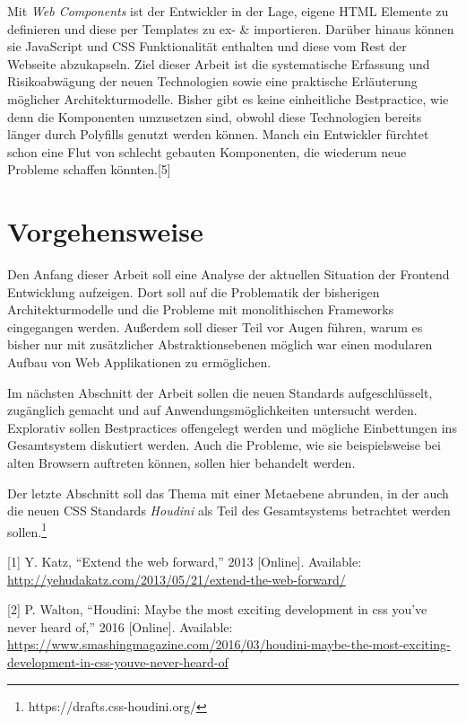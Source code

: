 Mit \emph{Web Components} ist der Entwickler in der Lage, eigene HTML
Elemente zu definieren und diese per Templates zu ex- \& importieren.
Darüber hinaus können sie JavaScript und CSS Funktionalität enthalten
und diese vom Rest der Webseite abzukapseln. Ziel dieser Arbeit ist die
systematische Erfassung und Risikoabwägung der neuen Technologien sowie
eine praktische Erläuterung möglicher Architekturmodelle. Bisher gibt es
keine einheitliche Bestpractice, wie denn die Komponenten umzusetzen
sind, obwohl diese Technologien bereits länger durch Polyfills genutzt
werden können. Manch ein Entwickler fürchtet schon eine Flut von
schlecht gebauten Komponenten, die wiederum neue Probleme schaffen
könnten.{[}5{]}

\section{Vorgehensweise}\label{vorgehensweise}

Den Anfang dieser Arbeit soll eine Analyse der aktuellen Situation der
Frontend Entwicklung aufzeigen. Dort soll auf die Problematik der
bisherigen Architekturmodelle und die Probleme mit monolithischen
Frameworks eingegangen werden. Außerdem soll dieser Teil vor Augen
führen, warum es bisher nur mit zusätzlicher Abstraktionsebenen möglich
war einen modularen Aufbau von Web Applikationen zu ermöglichen.

Im nächsten Abschnitt der Arbeit sollen die neuen Standards
aufgeschlüsselt, zugänglich gemacht und auf Anwendungsmöglichkeiten
untersucht werden. Explorativ sollen Bestpractices offengelegt werden
und mögliche Einbettungen ins Gesamtsystem diskutiert werden. Auch die
Probleme, wie sie beispielsweise bei alten Browsern auftreten können,
sollen hier behandelt werden.

Der letzte Abschnitt soll das Thema mit einer Metaebene abrunden, in der
auch die neuen CSS Standards \emph{Houdini} als Teil des Gesamtsystems
betrachtet werden sollen.\footnote{https://drafts.css-houdini.org/}

\hypertarget{refs}{}
\hypertarget{ref-Katz2013}{}
{[}1{]} Y. Katz, ``Extend the web forward,'' 2013 {[}Online{]}.
Available:
\url{http://yehudakatz.com/2013/05/21/extend-the-web-forward/}

\hypertarget{ref-Walton2016}{}
{[}2{]} P. Walton, ``Houdini: Maybe the most exciting development in css
you've never heard of,'' 2016 {[}Online{]}. Available:
\url{https://www.smashingmagazine.com/2016/03/houdini-maybe-the-most-exciting-development-in-css-youve-never-heard-of}

